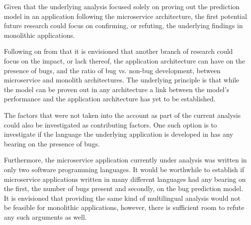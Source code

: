 Given that the underlying analysis focused solely on proving out the prediction model in an application following the microservice architecture, the first potential future research could focus on confirming, or refuting, the underlying findings in monolithic applications. 

Following on from that it is envisioned that another branch of research could focus on the impact, or lack thereof, the application architecture can have on the presence of bugs, and the ratio of bug vs. non-bug development, between microservice and monolith architectures. The underlying principle is that while the model can be proven out in any architecture a link between the model's performance and the application architecture has yet to be established.

The factors that were not taken into the account as part of the current analysis could also be investigated as contributing factors. One such option is to investigate if the language the underlying application is developed in has any bearing on the presence of bugs. 

Furthermore, the microservice application currently under analysis was written in only two software programming languages. It would be worthwhile to establish if microservice applications written in many different languages had any bearing on the first, the number of bugs present and secondly, on the bug prediction model. It is envisioned that providing the same kind of multilingual analysis would not be  feasible for monolithic applications, however, there is sufficient room to refute any such arguments as well.
